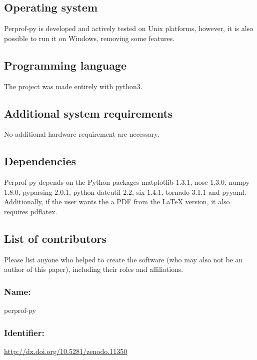 \subsection*{Operating system}

    Perprof-py is developed and actively tested on Unix platforms, however, it
    is also possible to run it on Windows, removing some features.

\subsection*{Programming language}

    The project was made entirely with python3.

\subsection*{Additional system requirements}

    No additional hardware requirement are necessary.

\subsection*{Dependencies}

    Perprof-py depends on the Python packages matplotlib-1.3.1, nose-1.3.0,
    numpy-1.8.0, pyparsing-2.0.1, python-dateutil-2.2, six-1.4.1, tornado-3.1.1
    and pyyaml. Additionally, if the user wants the a PDF from the LaTeX
    version, it also requires pdflatex.

\subsection*{List of contributors}

    Please list anyone who helped to create the software (who may also not be an
    author of this paper), including their roles and affiliations.

\Archive

    \subsubsection*{Name:} perprof-py

    \subsubsection*{Identifier:} \url{http://dx.doi.org/10.5281/zenodo.11350}

